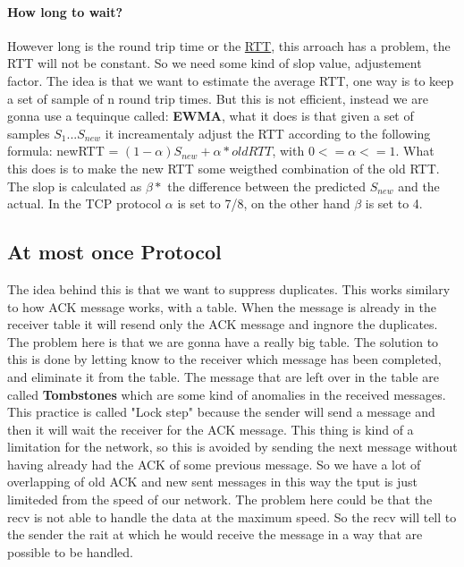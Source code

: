 \documentclass{article}
\begin{document}
      \paragraph{How long to wait?} However long is the round trip time or the \underline{RTT},
        this arroach has a problem, the RTT will not be constant. So we need some kind of slop
        value, adjustement factor. The idea is that we want to estimate the average RTT, one way
        is to keep a set of sample of n round trip times. But this is not efficient, instead 
        we are gonna use a tequinque called: \textbf{EWMA}, what it does is that given a set of
        samples $S_1 ... S_{new}$ it increamentaly adjust the RTT according to the following 
        formula: newRTT = $(1 - \alpha)S_{new} + \alpha * oldRTT$, with $0<=\alpha<=1$. What 
        this does is to make the new RTT some weigthed combination of the old RTT. The 
        slop is calculated as $\beta * $ the difference between the predicted $S_{new}$ 
        and the actual. In the TCP protocol $\alpha$ is set to 7/8, on the other hand $\beta$
        is set to 4.
    \subsection{At most once Protocol}
      The idea behind this is that we want to suppress duplicates. This works similary to 
      how ACK message works, with a table. When the message is already in the receiver table
      it will resend only the ACK message and ingnore the duplicates. The problem here is that
      we are gonna have a really big table. The solution to this is done by letting know 
      to the receiver which message has been completed, and eliminate it from the table.
      The message that are left over in the table are called \textbf{Tombstones} which are
      some kind of anomalies in the received messages. This practice is called "Lock step"
      because the sender will send a message and then it will wait the receiver for the
      ACK message. This thing is kind of a limitation for the network, so this is avoided
      by sending the next message without having already had the ACK of some previous message.
      So we have a lot of overlapping of old ACK and new sent messages in this way the tput
      is just limiteded from the speed of our network. The problem here could be that the recv
      is not able to handle the data at the maximum speed. So the recv will tell to the sender
      the rait at which he would receive the message in a way that are possible to be handled.
\end{document}
